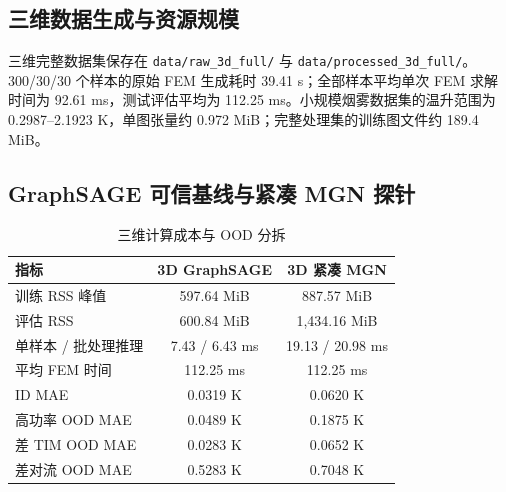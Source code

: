 \documentclass[11pt,a4paper]{article}
\newcommand{\code}[1]{\texttt{#1}}
\begin{document}
\subsection{三维数据生成与资源规模}
三维完整数据集保存在 \code{data/raw\_3d\_full/} 与 \code{data/processed\_3d\_full/}。300/30/30 个样本的原始 FEM 生成耗时 39.41 s；全部样本平均单次 FEM 求解时间为 92.61 ms，测试评估平均为 112.25 ms。小规模烟雾数据集的温升范围为 0.2987--2.1923 K，单图张量约 0.972 MiB；完整处理集的训练图文件约 189.4 MiB。

\subsection{GraphSAGE 可信基线与紧凑 MGN 探针}
\begin{table}[H]
\centering
\caption{三维模型实测结果（CPU）}
\label{tab:3d-results}
\end{table}

\begin{table}[H]
\centering
\caption{三维计算成本与 OOD 分拆}
\label{tab:3d-cost-ood}
\begin{tabular}{lcc}
\toprule
指标 & 3D GraphSAGE & 3D 紧凑 MGN \\
\midrule
训练 RSS 峰值 & 597.64 MiB & 887.57 MiB \\
评估 RSS & 600.84 MiB & 1,434.16 MiB \\
单样本 / 批处理推理 & 7.43 / 6.43 ms & 19.13 / 20.98 ms \\
平均 FEM 时间 & 112.25 ms & 112.25 ms \\
ID MAE & 0.0319 K & 0.0620 K \\
高功率 OOD MAE & 0.0489 K & 0.1875 K \\
差 TIM OOD MAE & 0.0283 K & 0.0652 K \\
差对流 OOD MAE & 0.5283 K & 0.7048 K \\
\bottomrule
\end{tabular}
\end{table}
\end{document}
